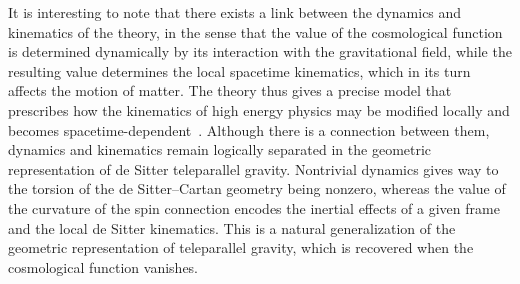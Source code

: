 \documentclass[%
5p,
times,
sort&compress
]{elsarticle}
\begin{document}
It is interesting to note that there exists a link between the 
dynamics and kinematics of the theory, in the sense that the 
value of the cosmological function is determined dynamically by 
its interaction with the gravitational field, while the resulting 
value determines the local spacetime kinematics, which in its 
turn affects the motion of matter. The theory thus gives 
a precise model that prescribes how the kinematics of high energy 
physics may be modified locally and becomes 
spacetime-dependent~\cite{Mansouri:2002cg}. Although there is 
a connection between them, dynamics and kinematics remain 
logically separated in the geometric representation of de Sitter 
teleparallel gravity. Nontrivial dynamics gives way to the 
torsion of the de Sitter--Cartan geometry being nonzero, whereas 
the value of the curvature of the spin connection encodes the 
inertial effects of a given frame and the local de Sitter 
kinematics. This is a natural generalization of the geometric 
representation of teleparallel gravity, which is recovered when 
the cosmological function vanishes.
\end{document}
